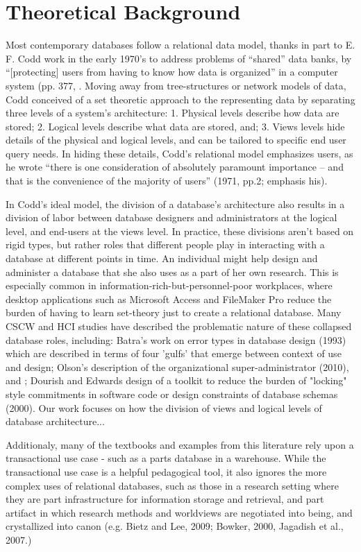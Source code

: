 \section{Theoretical Background}

Most contemporary databases follow a relational data model, thanks in part to E. F. Codd work in the early 1970's to address problems of “shared” data banks, by  “[protecting] users from having to know how data is organized” in a computer system (pp. 377, \cite{Codd_1970}. Moving away from tree-structures or network models of data, Codd conceived of a set theoretic approach to the representing data by separating three levels of a system's architecture: 1. Physical levels describe how data are stored; 2. Logical levels describe what data are stored, and; 3. Views levels hide details of the physical and logical levels, and can be tailored to specific end user query needs. In hiding these details, Codd's relational model emphasizes users, as he wrote “there is one consideration of absolutely paramount importance – and that is the convenience of the majority of users” (1971, pp.2; emphasis his). 

In Codd's ideal model, the division of a database's architecture also results in a division of labor between database designers and administrators at the logical level, and end-users at the views level. In practice, these divisions aren't based on rigid types, but rather roles that different people play in interacting with a database at different points in time. An individual might help design and administer a database that she also uses as a part of her own research. This is especially common in information-rich-but-personnel-poor workplaces, where desktop applications such as Microsoft Access and FileMaker Pro reduce the burden of having to learn set-theory just to create a relational database. Many CSCW and HCI studies have described the problematic nature of these collapsed database roles, including: Batra's work on error types in database design (1993) which are described in terms of  four 'gulfs' that emerge between context of use and design; Olson's description of the organizational super-administrator (2010), and ; Dourish and Edwards design of a toolkit to reduce the burden of "locking" style commitments in software code or design constraints of database schemas (2000). Our work focuses on how the division of views and logical levels of database architecture...  

Additionaly, many of the textbooks and examples from this literature rely upon a transactional use case - such as a parts database in a warehouse. While the transactional use case is a helpful pedagogical tool, it also  ignores the more complex uses of relational databases, such as those in a research setting where they are part infrastructure for information storage and retrieval, and part artifact in which research methods and worldviews are negotiated into being, and crystallized into canon (e.g. Bietz and Lee, 2009; Bowker, 2000, Jagadish et al., 2007.)  


